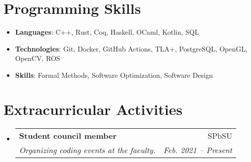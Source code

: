 \documentclass[letterpaper,11pt]{article}
\makeatletter
\newcommand{\resumeSubheading}[4]{
  \vspace{-1pt}\item
    \begin{tabular*}{0.97\textwidth}{l@{\extracolsep{\fill}}r}
      \textbf{#1} & #2 \\
      \textit{\small#3} & \textit{\small #4} \\
    \end{tabular*}\vspace{-5pt}
}
\newcommand{\resumeSubHeadingListStart}{\begin{itemize}[leftmargin=*]}
\newcommand{\resumeSubHeadingListEnd}{\end{itemize}}
\makeatother
\begin{document}
\section{Programming Skills}
  \resumeSubHeadingListStart
    \item{
      \textbf{Languages}{: C++, Rust, Coq, Haskell, OCaml, Kotlin, SQL }
    }
    \item{
      \textbf{Technologies}{: Git, Docker, GitHub Actions, TLA+, PostgreSQL, OpenGL, OpenCV, ROS } \\
    }
    \item{
      \textbf{Skills}{: Formal Methods, Software Optimization, Software Design }
    }
  \resumeSubHeadingListEnd

\section{Extracurricular Activities}
  \resumeSubHeadingListStart
    \resumeSubheading{Student council member}{SPbSU}
      {Organizing coding events at the faculty.}{Feb. 2021 -- Present}
  \resumeSubHeadingListEnd


\end{document}

